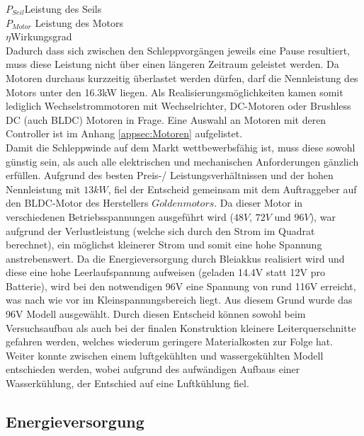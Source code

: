 $ P_{Seil} $\quad 	Leistung des Seils     \\
$ P_{Motor} $  Leistung des Motors    \\
$ \eta $\qquad  Wirkungsgrad     \\

Dadurch dass sich zwischen den Schleppvorgängen jeweils eine Pause resultiert, muss diese Leistung nicht über einen längeren Zeitraum geleistet werden. Da Motoren durchaus kurzzeitig überlastet werden dürfen, darf die Nennleistung des Motors unter den 16.3kW liegen. Als Realisierungsmöglichkeiten kamen somit lediglich Wechselstrommotoren mit Wechselrichter, DC-Motoren oder Brushless DC (auch BLDC) Motoren in Frage. Eine Auswahl an Motoren mit deren Controller ist im Anhang \ref{appsec:Motoren} aufgelistet.\\
Damit die Schleppwinde auf dem Markt wettbewerbsfähig ist, muss diese sowohl günstig sein, als auch alle elektrischen und mechanischen Anforderungen gänzlich erfüllen. Aufgrund des besten Preis-/ Leistungsverhältnissen und der hohen Nennleistung mit $ 13kW $, fiel der Entscheid gemeinsam mit dem Auftraggeber auf den BLDC-Motor des Herstellers $ Goldenmotors $. Da dieser Motor in verschiedenen Betriebsspannungen ausgeführt wird ($ 48V $, $ 72V $ und $ 96V $), war aufgrund der Verlustleistung (welche sich durch den Strom im Quadrat berechnet), ein möglichst kleinerer Strom und somit eine hohe Spannung anstrebenswert. Da die Energieversorgung durch Bleiakkus realisiert wird und diese eine hohe Leerlaufspannung aufweisen (geladen 14.4V statt 12V pro Batterie), wird bei den notwendigen 96V eine Spannung von rund 116V erreicht, was nach wie vor im Kleinspannungsbereich liegt. Aus diesem Grund wurde das 96V Modell ausgewählt. Durch diesen Entscheid können sowohl beim Versuchsaufbau als auch bei der finalen Konstruktion kleinere Leiterquerschnitte gefahren werden, welches wiederum geringere Materialkosten zur Folge hat. Weiter konnte zwischen einem luftgekühlten und wassergekühlten Modell entschieden werden, wobei aufgrund des aufwändigen Aufbaus einer Wasserkühlung, der Entschied auf eine Luftkühlung fiel.  


\subsection{Energieversorgung}\label{subsec:Energieversorgung}

